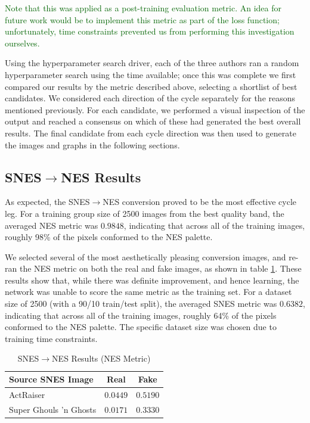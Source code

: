 \documentclass[10pt,twocolumn,letterpaper]{article}
\begin{document}
\textcolor{darkgreen}{Note that this was applied as a post-training evaluation metric. An idea for future work would be to implement this metric as part of the loss function; unfortunately, time constraints prevented us from performing this investigation ourselves.}


Using the hyperparameter search driver, each of the three authors ran a random hyperparameter search using the time available; once this was complete we first compared our results by the metric described above, selecting a shortlist of best candidates. We considered each direction of the cycle separately for the reasons mentioned previously. For each candidate, we performed a visual inspection of the output and reached a consensus on which of these had generated the best overall results. The final candidate from each cycle direction was then used to generate the images and graphs in the following sections.


\subsection{SNES$\rightarrow$NES Results}

As expected, the SNES$\rightarrow$NES conversion proved to be the most effective cycle leg. For a training group size of 2500 images from the best quality band, the averaged NES metric was $0.9848$, indicating that across all of the training images, roughly 98\% of the pixels conformed to the NES palette.


We selected several of the most aesthetically pleasing conversion images, and re-ran the NES metric on both the real and fake images, as shown in table \ref{tab:nesresults}.
These results show that, while there was definite improvement, and hence learning, the network was unable to score the same metric as the training set. For a dataset size of 2500 (with a 90/10 train/test split), the averaged SNES metric was $0.6382$, indicating that across all of the training images, roughly 64\% of the pixels conformed to the NES palette. The specific dataset size was chosen due to training time constraints.

\begin{table}[H]
   \begin{center}
      \begin{tabular}{|l|c|c|}
         \hline
         Source SNES Image      & Real     & Fake     \\
         \hline\hline
         ActRaiser              & $0.0449$ & $0.5190$ \\
         Super Ghouls 'n Ghosts & $0.0171$ & $0.3330$ \\
         \hline
      \end{tabular}
   \end{center}
   \caption{SNES$\rightarrow$NES Results (NES Metric)}
   \label{tab:nesresults}
\end{table}
\end{document}
